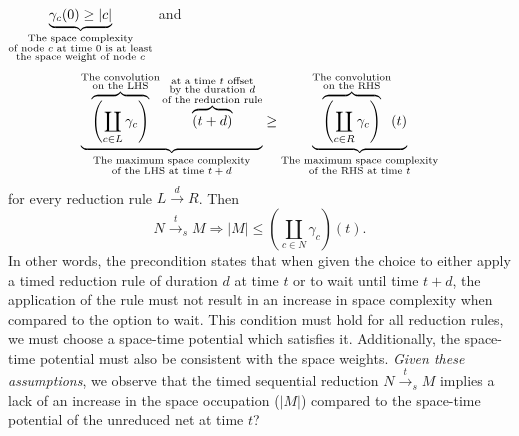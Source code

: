 \documentclass{fit-teorsem}
\begin{document}
\begin{itemize}
		$\underbrace{\gamma_c(0) \ge |c|}_{\begin{subarray}{c}
			\text{The space complexity} \\
			\text{of node $c$ at time $0$ is at least} \\
			\text{the space weight of node $c$}
		\end{subarray}}$ and \[
			\underbrace{\overbrace{\left(\coprod_{c \in L} \gamma_c\right)}^{\begin{subarray}{c}
					\text{The convolution} \\
					\text{on the LHS}
				\end{subarray}}\overbrace{(t + d)}^{\begin{subarray}{c}
					\text{at a time $t$ offset} \\
					\text{by the duration $d$} \\
					\text{of the reduction rule}
				\end{subarray}}}_{
			\begin{subarray}{c}
				\text{The maximum space complexity} \\
				\text{of the LHS at time $t + d$}
			\end{subarray}}
				\ge \underbrace{\overbrace{\left(\coprod_{c \in R} \gamma_c\right)}^{\begin{subarray}{c}
						\text{The convolution} \\
						\text{on the RHS}
					\end{subarray}}(t)}_{
				\begin{subarray}{c}
					\text{The maximum space complexity} \\
					\text{of the RHS at time $t$}
				\end{subarray}}
		\] for every reduction rule $L \stackrel{d}{\longrightarrow} R$. Then \[
			N \stackrel{t}{\longrightarrow}_s M
				\Longrightarrow |M| \le \left(\coprod_{c \in N} \gamma_c\right)(t)
		.\]
		In other words, the precondition states that when given the choice to either apply a timed
		reduction rule of duration $d$ at time $t$ or to wait until time $t + d$, the application
		of the rule must not result in an increase in space complexity when compared to the option
		to wait. This condition must hold for all reduction rules, we must choose a space-time
		potential which satisfies it. Additionally, the space-time potential must also be consistent
		with the space weights. \textit{Given these assumptions}, we observe that the timed sequential
		reduction $N \stackrel{t}{\longrightarrow}_s M$ implies a lack of an increase in the space
		occupation ($|M|$) compared to the space-time potential of the unreduced net at time $t$?


\end{itemize}
\end{document}
